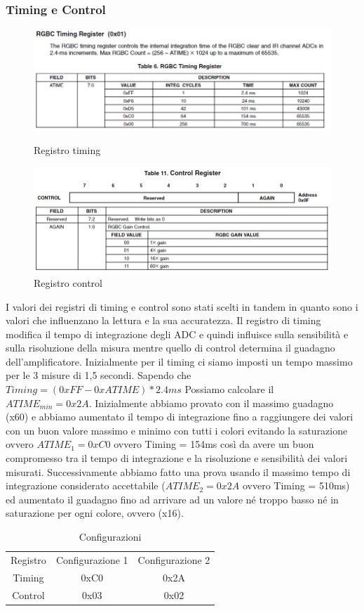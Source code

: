 \documentclass[a4paper,12pt]{report}
\begin{document}
\subsubsection{Timing e Control}
\begin{figure}[h] 
    \centering
    \includegraphics[width=0.65\linewidth]{images/Immagini sensore/registro timing.png}
    \caption{Registro timing}
    \includegraphics[width=0.65\linewidth]{images/Immagini sensore/registro control.png}
    \caption{Registro control}
    \end{figure}
    I valori dei registri di timing e control sono stati scelti in tandem in quanto sono i valori che influenzano la lettura e la sua accuratezza. Il registro di timing modifica il tempo di integrazione degli ADC e quindi influisce sulla sensibilità e sulla risoluzione della misura mentre quello di control determina il guadagno dell'amplificatore. Inizialmente per il timing ci siamo imposti un tempo massimo per le 3 misure di 1,5 secondi. Sapendo che $Timing = (0xFF - 0xATIME) * 2.4ms$ Possiamo calcolare il \(ATIME_{min} = 0x2A\). Inizialmente abbiamo provato con il massimo guadagno (x60) e abbiamo aumentato il tempo di integrazione fino a raggiungere dei valori con un buon valore massimo e minimo con tutti i colori evitando la saturazione ovvero \(ATIME_{1} = 0xC0\) ovvero Timing = 154ms così da avere un buon compromesso tra il tempo di integrazione e la risoluzione e sensibilità dei valori misurati. Successivamente abbiamo fatto una prova usando il massimo tempo di integrazione considerato accettabile (\(ATIME_{2} = 0x2A\)  ovvero Timing = 510ms) ed aumentato il guadagno fino ad arrivare ad un valore né troppo basso né in saturazione per ogni colore, ovvero (x16).
    \label{subsubsec:Timing}
    \begin{table}[h]
        \centering
        \begin{tabular}{ccc}
            Registro & Configurazione 1 & Configurazione 2\\
             Timing& 0xC0 & 0x2A\\
             Control& 0x03 & 0x02\\
        \end{tabular}
        \caption{Configurazioni}
        \label{tab:configurazioni}
    \end{table}
\end{document}
